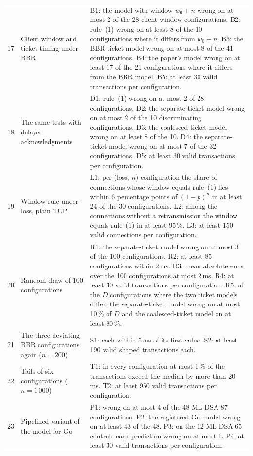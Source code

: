 \documentclass[9pt]{article}
\begin{document}
\begin{footnotesize}
\begin{longtable}{@{}p{}p{}p{}@{}}
17 & Client window and ticket timing under BBR & B1: the model with window $w_0+n$ wrong on at most 2 of the 28 client-window configurations. B2: rule~(1) wrong on at least 8 of the 10 configurations where it differs from $w_0+n$. B3: the BBR ticket model wrong on at most 8 of the 41 configurations. B4: the paper's model wrong on at least 17 of the 21 configurations where it differs from the BBR model. B5: at least 30 valid transactions per configuration.\\
18 & The same tests with delayed acknowledgments & D1: rule~(1) wrong on at most 2 of 28 configurations. D2: the separate-ticket model wrong on at most 2 of the 10 discriminating configurations. D3: the coalesced-ticket model wrong on at least 8 of the 10. D4: the separate-ticket model wrong on at most 7 of the 32 configurations. D5: at least 30 valid transactions per configuration.\\
19 & Window rule under loss, plain TCP & L1: per (loss, $n$) configuration the share of connections whose window equals rule~(1) lies within 6 percentage points of $(1-p)^n$ in at least 24 of the 30 configurations. L2: among the connections without a retransmission the window equals rule~(1) in at least 95\,\%. L3: at least 150 valid connections per configuration.\\
20 & Random draw of 100 configurations & R1: the separate-ticket model wrong on at most 3 of the 100 configurations. R2: at least 85 configurations within 2\,ms. R3: mean absolute error over the 100 configurations at most 2\,ms. R4: at least 30 valid transactions per configuration. R5: of the $D$ configurations where the two ticket models differ, the separate-ticket model wrong on at most 10\,\% of $D$ and the coalesced-ticket model on at least 80\,\%.\\
21 & The three deviating BBR configurations again ($n=200$) & S1: each within 5\,ms of its first value. S2: at least 190 valid shaped transactions each.\\
22 & Tails of six configurations ($n=1\,000$) & T1: in every configuration at most 1\,\% of the transactions exceed the median by more than 20\,ms. T2: at least 950 valid transactions per configuration.\\
23 & Pipelined variant of the model for Go & P1: wrong on at most 4 of the 48 ML-DSA-87 configurations. P2: the registered Go model wrong on at least 43 of the 48. P3: on the 12 ML-DSA-65 controls each prediction wrong on at most 1. P4: at least 30 valid transactions per configuration.\\

\end{longtable}
\end{footnotesize}
\end{document}
